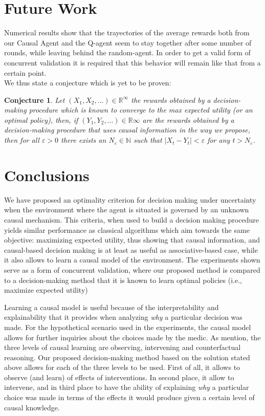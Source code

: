\documentclass[letterpaper]{article} %
\theoremstyle{plain}
\newtheorem{conj}{Conjecture}
\begin{document}
\section{Future Work}
Numerical results show that the trayectories of the average rewards both from our Causal Agent and the Q-agent seem to stay together after some number of rounds, while leaving behind the random-agent. In order to get a valid form of concurrent validation it is required that this behavior will remain like that from a certain point. \\
We thus state a conjecture which is yet to be proven:
\begin{conj}
Let $(X_1,X_2,...) \in \mathbb{R}^\infty$ the rewards obtained by a decision-making procedure which is known to converge to the max expected utility (or an optimal policy), then, if $(Y_1, Y_2,...) \in \mathbb{R}\infty$ are the rewards obtained by a decision-making procedure that uses causal information in the way we propose, then for all $\varepsilon > 0$ there exists an $N_\varepsilon \in \mathbb{N}$ such that $ | X_t - Y_t | < \varepsilon$ for any $t > N_\varepsilon$.
\end{conj}

\section{Conclusions}
We have proposed an optimality criterion for decision making under uncertainty when the environment where the agent is situated is governed by an unknown causal mechanism. This criteria, when used to build a decision making procedure yields similar performance as classical algorithms which aim towards the same objective: maximizing expected utility, thus showing that causal information, and causal-based decision making is at least as useful as associative-based case, while it also allows to learn a causal model of the environment. The experiments shown serve as a form of concurrent validation, where our proposed method is compared to a decision-making method that it is known to learn optimal policies (i.e., maximize expected utility)

Learning a causal model is useful because of the interpretability and explainability that it provides when analyzing \textit{why} a particular decision was made. For the hypothetical scenario used in the experiments, the causal model allows for further inquiries about the choices made by the medic. As \cite{pearl2018why} mention, the three levels of causal learning are observing, intervening and counterfactual reasoning. Our proposed decision-making method based on the solution stated above allows for each of the three levels to be used. First of all, it allows to observe (and learn) of effects of interventions. In second place, it allow to intervene, and in third place to have the ability of explaining \textit{why} a particular choice was made in terms of the effects it would produce given a certain level of causal knowledge.
\end{document}
